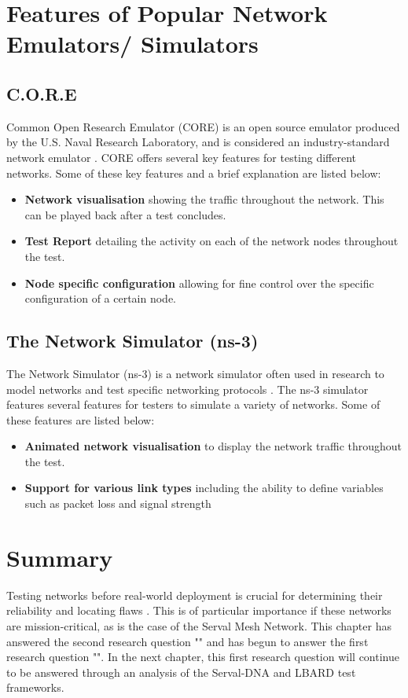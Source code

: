 \section{Features of Popular Network Emulators/ Simulators}
\subsection{C.O.R.E}
Common Open Research Emulator (CORE) is an open source emulator produced by the U.S. Naval Research Laboratory, and is considered an industry-standard network emulator \parencite{coreDocumentation}.
CORE offers several key features for testing different networks. Some of these key features and a brief explanation are listed below:
\begin{itemize}
    \item \textbf{Network visualisation} showing the traffic throughout the network. This can be played back after a test concludes.
    \item \textbf{Test Report} detailing the activity on each of the network nodes throughout the test.
    \item \textbf{Node specific configuration} allowing for fine control over the specific configuration of a certain node.
\end{itemize}

\subsection{The Network Simulator (ns-3)}
The Network Simulator (ns-3) is a network simulator often used in research to model networks and test specific networking protocols \parencite{modellingAndTools2010}.
The ns-3 simulator features several features for testers to simulate a variety of networks. Some of these features are listed below:
\begin{itemize}
    \item \textbf{Animated network visualisation} to display the network traffic throughout the test.
    \item \textbf{Support for various link types} including the ability to define variables such as packet loss and signal strength
\end{itemize}


\section{Summary}
Testing networks before real-world deployment is crucial for determining their reliability and locating flaws \parencite{predeploymentTesting2006}.
This is of particular importance if these networks are mission-critical, as is the case of the Serval Mesh Network.
This chapter has answered the second research question "\secondRQ" and has begun to answer the first research question "\firstRQ".
In the next chapter, this first research question will continue to be answered through an analysis of the Serval-DNA and LBARD test frameworks.
